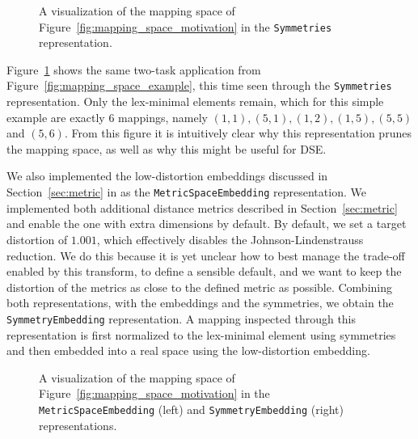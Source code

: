 \begin{figure}[h]
	\centering
  \resizebox{0.55\textwidth}{!}{
    \begin{tikzpicture}[x=1pt,y=1pt]
      
    \end{tikzpicture}
    }
	\caption{A visualization of the mapping space of Figure~\ref{fig:mapping_space_motivation} in the \texttt{Symmetries} representation.}
	\label{fig:example_space_symmetries}
\end{figure}

Figure~\ref{fig:example_space_symmetries} shows the same two-task application from Figure~\ref{fig:mapping_space_example}, this time seen through the \texttt{Symmetries} representation.
Only the lex-minimal elements remain, which for this simple example are exactly $6$ mappings, namely $(1,1), (5,1), (1,2), (1,5), (5,5)$ and $(5,6)$. 
From this figure it is intuitively clear why this representation prunes the mapping space, as well as why this might be useful for \ac{DSE}.

We also implemented the low-distortion embeddings discussed in Section~\ref{sec:metric} in \mocasin as the \texttt{MetricSpaceEmbedding} representation.
We implemented both additional distance metrics described in Section~\ref{sec:metric} and enable the one with extra dimensions by default.
By default, we set a target distortion of $1.001$, which effectively disables the Johnson-Lindenstrauss reduction. 
We do this because it is yet unclear how to best manage the trade-off enabled by this transform, to define a sensible default, and we want to keep the distortion of the metrics as close to the defined metric as possible.
Combining both representations, with the embeddings and the symmetries, we obtain the \texttt{SymmetryEmbedding} representation.
A mapping inspected through this representation is first normalized to the lex-minimal element using symmetries and then embedded into a real space using the low-distortion embedding.

\begin{figure}[h]
	\centering
  \resizebox{0.40\textwidth}{!}{
    \begin{tikzpicture}[x=1pt,y=1pt]
      
    \end{tikzpicture}
  }
  \resizebox{0.40\textwidth}{!}{
    \begin{tikzpicture}[x=1pt,y=1pt]
    
    \end{tikzpicture}
  }

	\caption{A visualization of the mapping space of Figure~\ref{fig:mapping_space_motivation} in the \texttt{MetricSpaceEmbedding} (left) and \texttt{SymmetryEmbedding} (right) representations.}
	\label{fig:example_space_embedding}
\end{figure}

